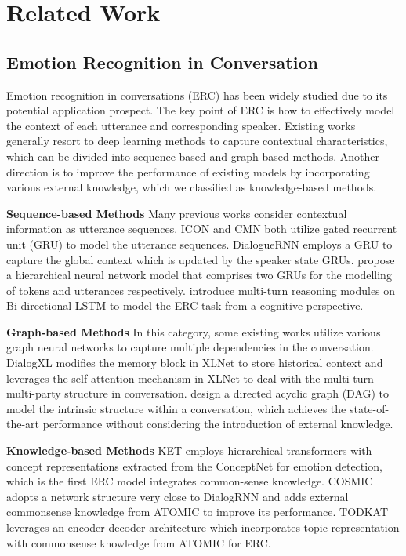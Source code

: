 \documentclass[letterpaper]{article} \usepackage{aaai22}  \usepackage{times}  \usepackage{helvet}  \usepackage{courier}  \usepackage[hyphens]{url}  \usepackage{graphicx} \urlstyle{rm} \def\UrlFont{\rm}  \usepackage{natbib}  \usepackage{caption} \DeclareCaptionStyle{ruled}{labelfont=normalfont,labelsep=colon,strut=off} \frenchspacing  \setlength{\pdfpagewidth}{8.5in}  \setlength{\pdfpageheight}{11in}
\begin{document}
\section{Related Work}

\subsection{Emotion Recognition in Conversation}


Emotion recognition in conversations (ERC) has been widely studied due to its potential application prospect. The key point of ERC is how to effectively model the context of each utterance and corresponding speaker. Existing works generally resort to deep learning methods to capture contextual characteristics, which can be divided into sequence-based and graph-based methods. Another direction is to improve the performance of existing models by incorporating various external knowledge, which we classified as knowledge-based methods. 

\textbf{Sequence-based Methods} Many previous works consider contextual information as utterance sequences. ICON \cite{hazarika2018icon} and CMN \cite{hazarika2018conversational} both utilize gated recurrent unit (GRU) to model the utterance sequences.  DialogueRNN \cite{majumder2019dialoguernn} employs a GRU to capture the global context which is updated by the speaker state GRUs. \citet{jiao2019higru} propose a hierarchical neural network model that comprises two GRUs for the modelling of tokens and utterances respectively. \citet{hu2021dialoguecrn} introduce multi-turn reasoning modules on Bi-directional LSTM to model the ERC task from a cognitive perspective.


\textbf{Graph-based Methods} In this category, some existing works \cite{ghosal2019dialoguegcn,ishiwatari2020relation,zhang2019modeling} utilize various graph neural networks to capture multiple dependencies in the conversation. DialogXL \cite{shen2021dialogxl} modifies the memory block in XLNet \cite{yang2019xlnet} to store historical context and leverages the self-attention mechanism in XLNet to deal with the multi-turn multi-party structure in conversation. \citet{shen2021directed} design a directed acyclic graph (DAG) to model the intrinsic structure within a conversation, which achieves the state-of-the-art performance without considering the introduction of external knowledge.


\textbf{Knowledge-based Methods} KET \cite{zhong2019knowledge}  employs hierarchical transformers with concept representations extracted from the ConceptNet \cite{speer2017conceptnet} for emotion detection, which is the first ERC model integrates common-sense knowledge. COSMIC \cite{ghosal2020cosmic} adopts a network structure very close to DialogRNN and adds external commonsense knowledge from ATOMIC \cite{sap2019atomic} to improve its performance. TODKAT \cite{zhu2021topic} leverages an encoder-decoder architecture which incorporates topic representation with commonsense knowledge from ATOMIC for ERC. 
\end{document}
